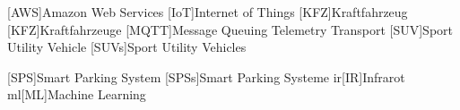 \begin{acronym}[KFZ]
    [AWS]{Amazon Web Services}
    [IoT]{Internet of Things}
    [KFZ]{Kraftfahrzeug}
    [KFZ]{Kraftfahrzeuge}
    [MQTT]{Message Queuing Telemetry Transport}
    [SUV]{Sport Utility Vehicle}
    [SUVs]{Sport Utility Vehicles}

    [SPS]{Smart Parking System}
    [SPSs]{Smart Parking Systeme}
    \ac{ir}[IR]{Infrarot}
    \ac{ml}[ML]{Machine Learning}
\end{acronym}